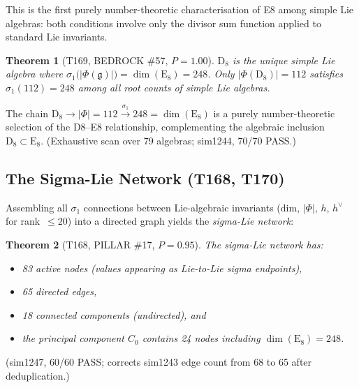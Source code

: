 \documentclass[aps,prd,twocolumn,superscriptaddress,floatfix,nofootinbib]{revtex4-2}
\newtheorem{theorem}{Theorem}
\theoremstyle{definition}
\theoremstyle{remark}
\begin{document}
\noindent
This is the first purely number-theoretic characterisation of E8
among simple Lie algebras: both conditions involve only the divisor
sum function applied to standard Lie invariants.

\begin{theorem}[T169, BEDROCK \#57, $P{=}1.00$]
$\mathrm{D}_8$ is the unique simple Lie algebra where
$\sigma_1\!\bigl(|\Phi(\mathfrak{g})|\bigr) = \dim(\mathrm{E}_8)
= 248$.  Only $|\Phi(\mathrm{D}_8)| = 112$ satisfies
$\sigma_1(112) = 248$ among all root counts of simple Lie algebras.
\end{theorem}

\noindent
The chain $\mathrm{D}_8 \to |\Phi| = 112 \xrightarrow{\sigma_1} 248
= \dim(\mathrm{E}_8)$ is a purely number-theoretic selection of the
D8--E8 relationship, complementing the algebraic inclusion
$\mathrm{D}_8 \subset \mathrm{E}_8$.
(Exhaustive scan over 79 algebras; sim1244, 70/70 PASS.)

\subsection{The Sigma-Lie Network (T168, T170)}
\label{sec:sigma-network}

Assembling all $\sigma_1$ connections between Lie-algebraic invariants
(dim, $|\Phi|$, $h$, $h^\vee$ for rank~$\le 20$) into a directed graph
yields the \emph{sigma-Lie network}:

\begin{theorem}[T168, PILLAR \#17, $P{=}0.95$]
The sigma-Lie network has:
\begin{itemize}
  \item 83 active nodes (values appearing as Lie-to-Lie sigma
        endpoints),
  \item 65 directed edges,
  \item 18 connected components (undirected), and
  \item the principal component $C_0$ contains 24 nodes including
        $\dim(\mathrm{E}_8) = 248$.
\end{itemize}
\end{theorem}

\noindent
(sim1247, 60/60 PASS; corrects sim1243 edge count from 68 to 65
after deduplication.)
\end{document}
